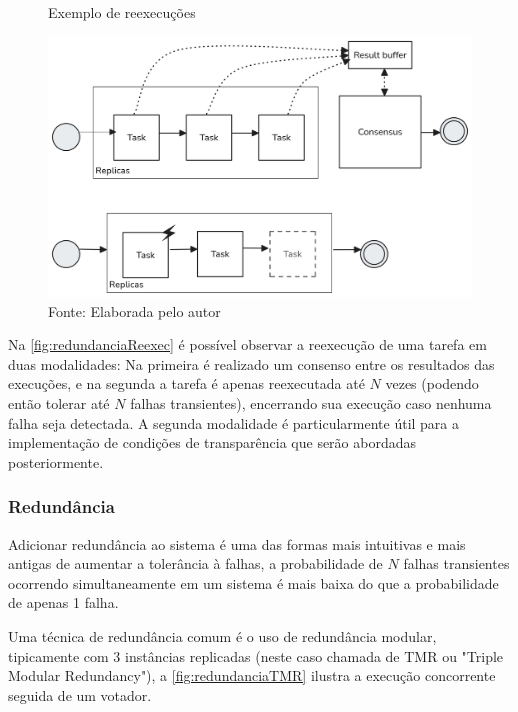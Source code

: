 \begin{figure}[H]
    \centering
	\captionsetup{justification=centering}
    \caption{Exemplo de reexecuções}
    \includegraphics[width=1.0\textwidth]{assets/redundancia_reexec.png}
	\captionsetup{justification=raggedright}
    \caption*{Fonte: Elaborada pelo autor}
    \label{fig:redundanciaReexec}
\end{figure}

Na \autoref{fig:redundanciaReexec} é possível observar a reexecução de uma tarefa em duas modalidades: Na primeira é realizado um consenso entre os resultados das execuções, e na segunda a tarefa é apenas reexecutada até $N$ vezes (podendo então tolerar até $N$ falhas transientes), encerrando sua execução caso nenhuma falha seja detectada. A segunda modalidade é particularmente útil para a implementação de condições de transparência \cite{SchedAndOptOfDistributedFT} que serão abordadas posteriormente.

\subsubsection{Redundância}

Adicionar redundância ao sistema é uma das formas mais intuitivas e mais antigas de aumentar a tolerância à falhas, a probabilidade de $N$ falhas transientes ocorrendo simultaneamente em um sistema é mais baixa do que a probabilidade de apenas 1 falha. %

Uma técnica de redundância comum é o uso de redundância modular, tipicamente com 3 instâncias replicadas (neste caso chamada de TMR ou "Triple Modular Redundancy"), a \autoref{fig:redundanciaTMR} ilustra a execução concorrente seguida de um votador.

